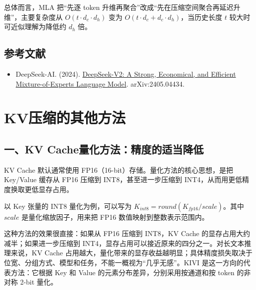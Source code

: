 总体而言，MLA 把``先逐 token 升维再聚合''改成``先在压缩空间聚合再延迟升维''，主要复杂度从 \(O(t \cdot d_c \cdot d_h)\) 变为 \(O(t \cdot d_c + d_c \cdot d_h)\)，当历史长度 \(t\) 较大时可近似理解为降低约 \(d_h\) 倍。

\hypertarget{ux53c2ux8003ux6587ux732e-95}{%
\subsection{参考文献}\label{ux53c2ux8003ux6587ux732e-95}}

\vspace{0.25em}
\begin{itemize}
\tightlist
\item
  DeepSeek-AI. (2024). \href{https://arxiv.org/abs/2405.04434}{DeepSeek-V2: A Strong, Economical, and Efficient Mixture-of-Experts Language Model}. arXiv:2405.04434.
\end{itemize}

\clearpage

\hypertarget{kvux538bux7f29ux7684ux5176ux4ed6ux65b9ux6cd5}{%
\section{KV压缩的其他方法}\label{kvux538bux7f29ux7684ux5176ux4ed6ux65b9ux6cd5}}

\hypertarget{ux4e00kv-cacheux91cfux5316ux65b9ux6cd5ux7cbeux5ea6ux7684ux9002ux5f53ux964dux4f4e}{%
\subsection{一、KV Cache量化方法：精度的适当降低}\label{ux4e00kv-cacheux91cfux5316ux65b9ux6cd5ux7cbeux5ea6ux7684ux9002ux5f53ux964dux4f4e}}

KV Cache 默认通常使用 FP16（16-bit）存储。量化方法的核心思想，是把 Key/Value 缓存从 FP16 压缩到 INT8，甚至进一步压缩到 INT4，从而用更低精度换取更低显存占用。

以 Key 张量的 INT8 量化为例，可以写为 \(K_{int8}=round(K_{fp16}/scale)\)。其中 \(scale\) 是量化缩放因子，用来把 FP16 数值映射到整数表示范围内。

这种方法的效果很直接：如果从 FP16 压缩到 INT8，KV Cache 的显存占用大约减半；如果进一步压缩到 INT4，显存占用可以接近原来的四分之一。对长文本推理来说，KV Cache 占用越大，量化带来的显存收益越明显；具体精度损失取决于位宽、分组方式、模型和任务，不能一概视为``几乎无感''。KIVI 是这一方向的代表方法：它根据 Key 和 Value 的元素分布差异，分别采用按通道和按 token 的非对称 2-bit 量化。

